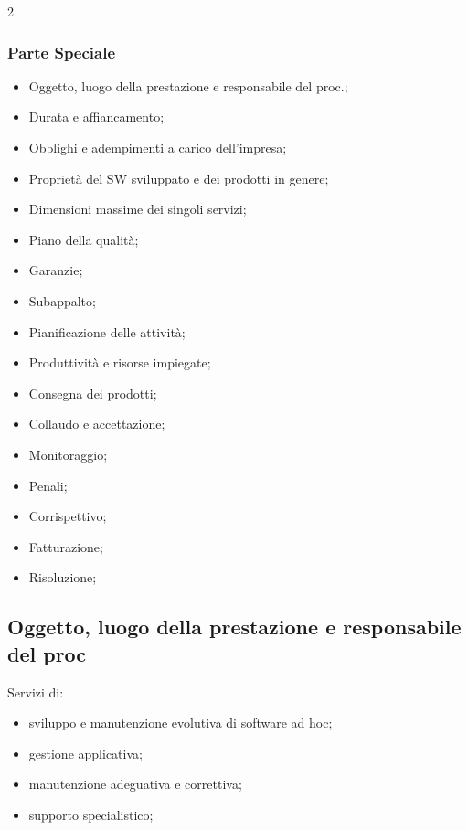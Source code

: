 \documentclass{article}
\begin{document}
\begin{multicols}{2}
\subsubsection{Parte Speciale}\label{sub:parte_speciale} %
    \begin{itemize}
        \item Oggetto, luogo della prestazione e responsabile del proc.;
        \item Durata e affiancamento;
        \item Obblighi e adempimenti a carico dell'impresa;
        \item Proprietà del SW sviluppato e dei prodotti in genere;
        \item Dimensioni massime dei singoli servizi;
        \item Piano della qualità;
        \item Garanzie;
        \item Subappalto;
        \item Pianificazione delle attività;
        \item Produttività e risorse impiegate;
        \item Consegna dei prodotti;
        \item Collaudo e accettazione;
        \item Monitoraggio;
        \item Penali;
        \item Corrispettivo;
        \item Fatturazione;
        \item Risoluzione;
    \end{itemize}
\end{multicols}
%
\subsection{Oggetto, luogo della prestazione e responsabile del proc}\label{sub:oggetto_luogo_della_prestazione_e_responsabile_del_proc} %
Servizi di:
\begin{itemize}
    \item sviluppo e manutenzione evolutiva di software ad hoc;
    \item gestione applicativa;
    \item manutenzione adeguativa e correttiva;
    \item supporto specialistico;
\end{itemize}
%
\end{document}
